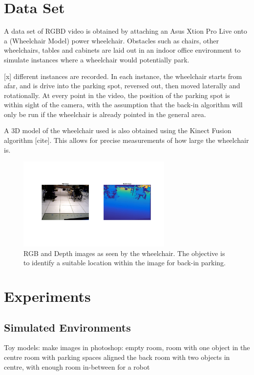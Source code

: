 \section{Data Set}
\label{sec:rgbddataset}
A data set of RGBD video is obtained by attaching an Asus Xtion Pro Live onto a
(Wheelchair Model) power wheelchair. Obstacles such as chairs, other
wheelchairs, tables and cabinets are laid out in an indoor office environment to
simulate instances where a wheelchair would potentially park.

[x] different instances are recorded. In each instance, the wheelchair starts
from afar, and is drive into the parking spot, reversed out, then moved
laterally and rotationally. At every point in the video, the position of the
parking spot is within sight of the camera, with the assumption that the back-in
algorithm will only be run if the wheelchair is already pointed in the general
area.

A 3D model of the wheelchair used is also obtained using the Kinect Fusion
algorithm [cite]. This allows for precise measurements of how large the
wheelchair is.

\begin{figure}
\centering
\includegraphics[width=3in]{figures/rgbdwheelchair.png}
\caption{RGB and Depth images as seen by the wheelchair. The objective is to
identify a suitable location within the image for back-in parking.}
\label{fig:rgbdwheelchair}
\end{figure}

\section{Experiments}

\subsection{Simulated Environments}
Toy models: make images in photoshop:
empty room,
room with one object in the centre
room with parking spaces aligned the back
room with two objects in centre, with enough room in-between for a robot

